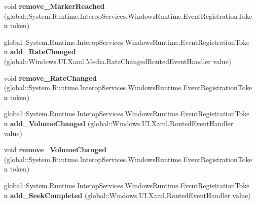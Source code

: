 \begin{DoxyCompactItemize}
void {\bfseries remove\+\_\+\+Marker\+Reached} (global\+::\+System.\+Runtime.\+Interop\+Services.\+Windows\+Runtime.\+Event\+Registration\+Token token)
\item 
\mbox{\label{interface_windows_1_1_u_i_1_1_xaml_1_1_controls_1_1_i_media_element_afdb9ef8dc66f874e5bd722e80ec927bb}} 
global\+::\+System.\+Runtime.\+Interop\+Services.\+Windows\+Runtime.\+Event\+Registration\+Token {\bfseries add\+\_\+\+Rate\+Changed} (global\+::\+Windows.\+U\+I.\+Xaml.\+Media.\+Rate\+Changed\+Routed\+Event\+Handler value)
\item 
\mbox{\label{interface_windows_1_1_u_i_1_1_xaml_1_1_controls_1_1_i_media_element_a9e5266118a01c36612caa255627e769e}} 
void {\bfseries remove\+\_\+\+Rate\+Changed} (global\+::\+System.\+Runtime.\+Interop\+Services.\+Windows\+Runtime.\+Event\+Registration\+Token token)
\item 
\mbox{\label{interface_windows_1_1_u_i_1_1_xaml_1_1_controls_1_1_i_media_element_aedd52f355cd6b0ac289dab97618b03b2}} 
global\+::\+System.\+Runtime.\+Interop\+Services.\+Windows\+Runtime.\+Event\+Registration\+Token {\bfseries add\+\_\+\+Volume\+Changed} (global\+::\+Windows.\+U\+I.\+Xaml.\+Routed\+Event\+Handler value)
\item 
\mbox{\label{interface_windows_1_1_u_i_1_1_xaml_1_1_controls_1_1_i_media_element_a60f936214a2f097646cfe13f567cf130}} 
void {\bfseries remove\+\_\+\+Volume\+Changed} (global\+::\+System.\+Runtime.\+Interop\+Services.\+Windows\+Runtime.\+Event\+Registration\+Token token)
\item 
\mbox{\label{interface_windows_1_1_u_i_1_1_xaml_1_1_controls_1_1_i_media_element_a64d29cca7343776b34eef183fe2f0a47}} 
global\+::\+System.\+Runtime.\+Interop\+Services.\+Windows\+Runtime.\+Event\+Registration\+Token {\bfseries add\+\_\+\+Seek\+Completed} (global\+::\+Windows.\+U\+I.\+Xaml.\+Routed\+Event\+Handler value)
\item 
\mbox{\label{interface_windows_1_1_u_i_1_1_xaml_1_1_controls_1_1_i_media_element_adb3cb1c1f4bff532d4654363a56adcf1}} 

\end{DoxyCompactItemize}
